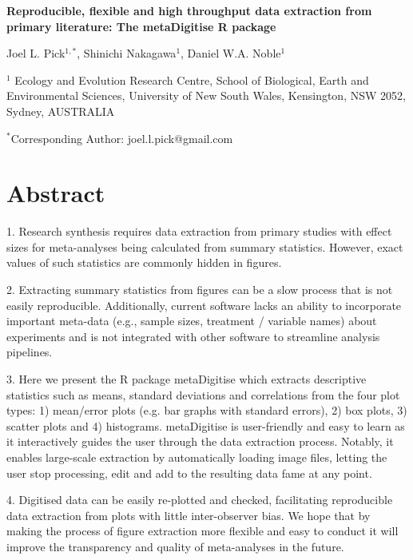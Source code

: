 \documentclass[12pt]{article}
\newcommand{\pkg}[1]{{\fontseries{b}\selectfont #1}}
\let\proglang=\textsf
\begin{document}
\newenvironment{CodeChunk}{}{}

\raggedright


\textbf{Reproducible, flexible and high throughput data extraction from primary literature: The \pkg{metaDigitise} \proglang{R} package}

Joel L. Pick$^{1,*}$, Shinichi Nakagawa$^1$, Daniel W.A. Noble$^1$

$^1$
  Ecology and Evolution Research Centre, School of Biological, Earth and Environmental Sciences,  University of New South Wales, Kensington, NSW 2052, Sydney, AUSTRALIA

 $^*$Corresponding Author: joel.l.pick@gmail.com\\


\clearpage
\section*{Abstract}
1. Research synthesis requires data extraction from primary studies with effect sizes for meta-analyses being calculated from summary statistics. However, exact values of such statistics are commonly hidden in figures. 

2. Extracting summary statistics from figures can be a slow process that is not easily reproducible. Additionally, current software lacks an ability to incorporate important meta-data (e.g., sample sizes, treatment / variable names) about experiments and is not integrated with other software to streamline analysis pipelines.

3. Here we present the R package \pkg{metaDigitise} which extracts descriptive statistics such as means, standard deviations and correlations from the four plot types: 1) mean/error plots (e.g. bar graphs with standard errors), 2) box plots, 3) scatter plots and 4) histograms. \pkg{metaDigitise} is user-friendly and easy to learn as it interactively guides the user through the data extraction process. Notably, it enables large-scale extraction by automatically loading image files, letting the user stop processing, edit and add to the resulting data fame at any point. 

4. Digitised data can be easily re-plotted and checked, facilitating reproducible data extraction from plots with little inter-observer bias. We hope that by making the process of figure extraction more flexible and easy to conduct it will improve the transparency and quality of meta-analyses in the future.
\end{document}
